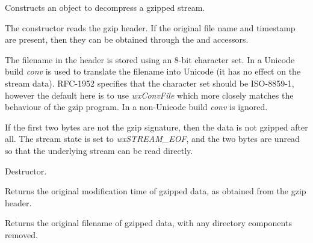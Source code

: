 \label{wxgzipinputstreamwxgzipinputstream}


Constructs an object to decompress a gzipped stream.

The constructor reads the gzip header. If the original file name and timestamp
are present, then they can be obtained through the 
  and
  accessors.

The filename in the header is stored using an 8-bit character set. In a
Unicode build {\it conv} is used to translate the filename into Unicode (it
has no effect on the stream data). RFC-1952 specifies that the character set
should be ISO-8859-1, however the default here is to use {\it wxConvFile}
 which more closely matches the behaviour of the gzip program. In
a non-Unicode build {\it conv} is ignored.

If the first two bytes are not the gzip signature, then the data is not
gzipped after all. The stream state is set to {\it wxSTREAM\_EOF}, and the
two bytes are unread so that the underlying stream can be read directly.


\label{wxgzipinputstreamdtor}


Destructor.


\label{wxgzipinputstreamgetdatetime}


Returns the original modification time of gzipped data, as obtained from the
gzip header.


\label{wxgzipinputstreamgetname}


Returns the original filename of gzipped data, with any directory components
removed.


%
%

\section{}\label{wxgzipoutputstream}


